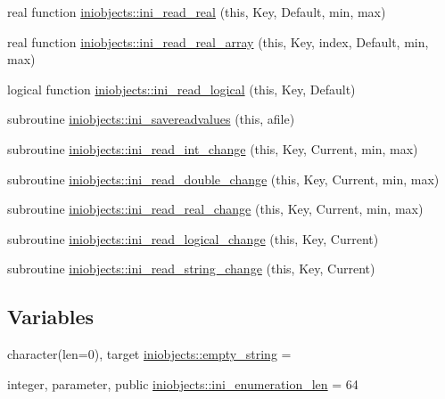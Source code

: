 \begin{DoxyCompactItemize}
\item 
real function \mbox{\hyperlink{namespaceiniobjects_a512c72d9b421e7832a796993523deaf4}{iniobjects\+::ini\+\_\+read\+\_\+real}} (this, Key, Default, min, max)
\item 
real function \mbox{\hyperlink{namespaceiniobjects_ac6b89cdbdb8074900386085ded996bc7}{iniobjects\+::ini\+\_\+read\+\_\+real\+\_\+array}} (this, Key, index, Default, min, max)
\item 
logical function \mbox{\hyperlink{namespaceiniobjects_a5eb68a820a33b02e0b7edec1bcf632f3}{iniobjects\+::ini\+\_\+read\+\_\+logical}} (this, Key, Default)
\item 
subroutine \mbox{\hyperlink{namespaceiniobjects_a3c4c3ca8183b5dcca8af9d4b19808462}{iniobjects\+::ini\+\_\+savereadvalues}} (this, afile)
\item 
subroutine \mbox{\hyperlink{namespaceiniobjects_a67f08b5a06f2f74225f692955a712320}{iniobjects\+::ini\+\_\+read\+\_\+int\+\_\+change}} (this, Key, Current, min, max)
\item 
subroutine \mbox{\hyperlink{namespaceiniobjects_a5e063b545af508f22c652618784a4106}{iniobjects\+::ini\+\_\+read\+\_\+double\+\_\+change}} (this, Key, Current, min, max)
\item 
subroutine \mbox{\hyperlink{namespaceiniobjects_ab840810b30c65a67b6834782fe064f34}{iniobjects\+::ini\+\_\+read\+\_\+real\+\_\+change}} (this, Key, Current, min, max)
\item 
subroutine \mbox{\hyperlink{namespaceiniobjects_a21e68c5f321b32ea2f6086c05c89af1a}{iniobjects\+::ini\+\_\+read\+\_\+logical\+\_\+change}} (this, Key, Current)
\item 
subroutine \mbox{\hyperlink{namespaceiniobjects_a6770561ba1885823e0a1d5d341cb7fa5}{iniobjects\+::ini\+\_\+read\+\_\+string\+\_\+change}} (this, Key, Current)
\end{DoxyCompactItemize}
\subsection*{Variables}
\begin{DoxyCompactItemize}
\item 
character(len=0), target \mbox{\hyperlink{namespaceiniobjects_a09461a87d61c35db5d0ad8895baae8dd}{iniobjects\+::empty\+\_\+string}} = \textquotesingle{}\textquotesingle{}
\item 
integer, parameter, public \mbox{\hyperlink{namespaceiniobjects_ad4e84129fd47c679fb1fcdd444d9fc84}{iniobjects\+::ini\+\_\+enumeration\+\_\+len}} = 64
\end{DoxyCompactItemize}
